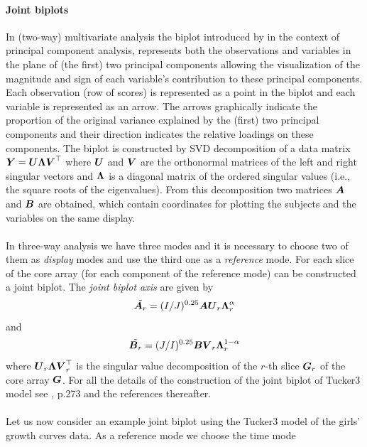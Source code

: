 \documentclass[article,shortnames, nojss]{jss}
\newcommand{\vv}[1]{\mbox{\boldmath$#1$}}
\begin{document}
\paragraph{Joint biplots} In (two-way) multivariate analysis the biplot introduced by
\cite{gabriel} in the context of principal component analysis, represents
both the observations and variables in the plane of (the first) two principal components
allowing the visualization of the magnitude and sign of each variable's contribution to these
principal components. Each observation (row of scores) is represented as a point in the biplot
and each variable is represented as an arrow. The arrows graphically indicate the proportion
of the original variance explained by the (first) two principal components and their direction
indicates the relative loadings on these components. The biplot is constructed by
SVD decomposition of a data matrix $\vv{Y}=\vv{U}\vv{\Lambda}\vv{V}^\top$ where $\vv{U}$
and $\vv{V}$ are the orthonormal matrices of the left and right singular vectors
and $\vv{\Lambda}$ is a diagonal matrix of the ordered singular values
(i.e., the square roots of the eigenvalues). From this decomposition  two matrices
$\vv{A}$ and $\vv{B}$ are obtained, which contain coordinates for plotting
the subjects and the variables on the same display.\\\\
In three-way analysis we have three modes and it is necessary to choose two
of them as \emph{display} modes and use the third one as a \emph{reference} mode.
For each slice of the core array (for each component of the reference mode)
can be constructed a joint biplot. The \emph{joint biplot axis} are given by
\begin{equation}
\label{eq:JB-axes-1}
\tilde{\vv{A}_r} = (I/J)^{0.25}\vv{A}\vv{U}_r\vv{\Lambda}_r^{\alpha}
\end{equation}
and
\begin{equation}
\label{eq:JB-axes-2}
\tilde{\vv{B}_r} = (J/I)^{0.25}\vv{B}\vv{V}_r\vv{\Lambda}_r^{1-\alpha}
\end{equation}
where $\vv{U}_r\vv{\Lambda}\vv{V}_r^\top$ is the singular value decomposition
of the $r$-th slice $\vv{G}_r$ of the core array $\vv{G}$. For all the details
of the construction of the joint biplot of Tucker3 model
see \cite{kroonenberg:2008}, p.273 and the references thereafter.\\\\
Let us now consider an example joint biplot using the Tucker3 model of the
girls' growth curves data. As a reference mode we choose the time mode
\end{document}
